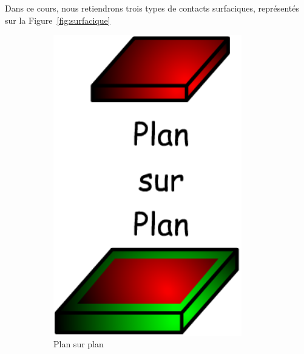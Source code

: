\documentclass[10pt,fleqn]{article} %
\begin{document}
Dans ce cours, nous retiendrons trois types de contacts surfaciques, représentés sur la Figure~\ref{fig:surfacique}

\begin{figure}[h]
  \begin{subfigure}[b]{0.3\textwidth}
    \centering
    \includegraphics[width=0.9\textwidth,height=.15\textheight,keepaspectratio]{images/surface_plan}
    \caption{Plan sur plan}
  \end{subfigure}\hfill
  \begin{subfigure}[b]{0.3\textwidth}
    \centering

\end{subfigure}
\end{figure}
\end{document}
